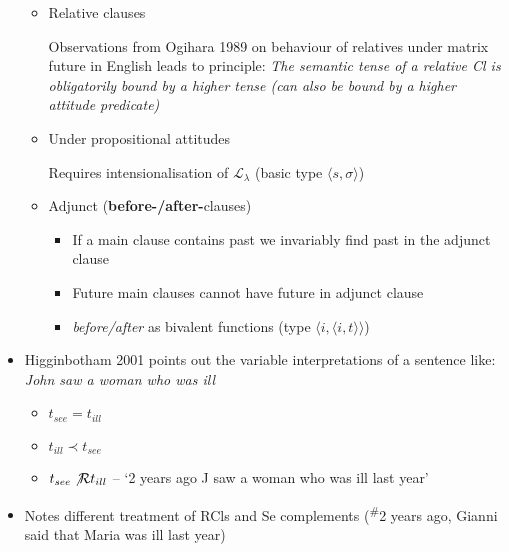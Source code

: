 \documentclass[10pt]{article}
\begin{document}
\begin{itemize}
	\begin{itemize}
		\item Relative clauses
		
		Observations from Ogihara 1989 on behaviour of relatives under matrix future in English leads to principle: \textit{The semantic tense of a relative Cl is obligatorily bound by a higher tense (can also be bound by a higher attitude predicate)}
		\item Under propositional attitudes
		
		Requires intensionalisation of $\mathcal L_\lambda$ (basic type $\langle s,\sigma\rangle$)
		\item Adjunct (\textbf{before-/after-}clauses)
	\begin{itemize}
		\item  If a main clause contains past we invariably find past in the adjunct clause
		\item Future main clauses cannot have future in adjunct clause
		\item \textit{before/after} as bivalent functions (type $\langle i,\langle i,t\rangle\rangle$)
		
			\end{itemize}	
	\end{itemize}


\item Higginbotham 2001 points out the variable interpretations of a sentence like: \textit{John saw a woman who was ill}
\begin{itemize}
	\item $ t_{see} = t_{ill} $
	\item $ t_{ill} \prec t_{see} $
	\item $ t_{see} \not\mathcal R t_{ill} $ -- `2 years ago J saw a woman who was ill last year'
\end{itemize}
\item Notes different treatment of RCls and Se complements (\textsuperscript\#2 years ago, Gianni said that Maria was ill last year)



\end{itemize}
\end{document}
